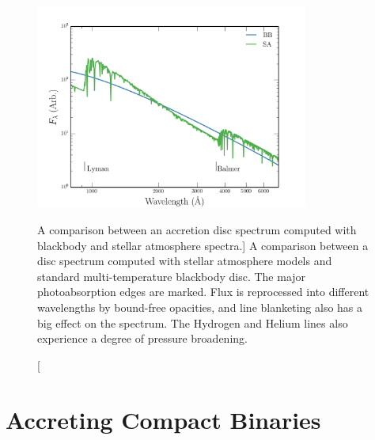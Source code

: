 \begin{figure}
\centering
\includegraphics[width=0.8\textwidth]{figures/01-intro/disc_spectrum_comparison.png}
\caption
[A comparison between an accretion disc spectrum computed 
with blackbody and stellar atmosphere spectra.]
{
A comparison between a disc spectrum computed with 
stellar atmosphere models and standard multi-temperature blackbody disc. The major photoabsorption
edges are marked. Flux is reprocessed into different wavelengths by bound-free opacities,
and line blanketing also has a big effect on the spectrum. The Hydrogen and Helium lines
also experience a degree of pressure broadening.
} 
\label{fig:bb_v_sa}
\end{figure}



\section{Accreting Compact Binaries}

